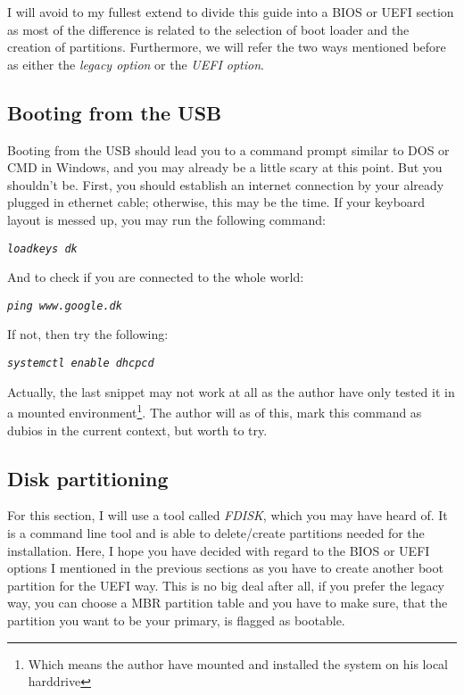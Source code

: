 \documentclass{article}
\newcommand{\code}[1]{\begin{center}
		\textit{\texttt{#1}}
\end{center}}
\begin{document}
	I will avoid to my fullest extend to divide this guide into a BIOS or UEFI section as most of the difference is related to the selection of boot loader and the creation of partitions. Furthermore, we will refer the two ways mentioned before as either  the  \textit{legacy option} or the  \textit{UEFI option}.\\
	
	 \subsection{Booting from the USB}
	 
	 Booting from the USB should lead you to a command prompt similar to DOS or CMD in Windows, and you may already be a little scary at this point. But you shouldn't be. First, you should establish an internet connection by your already plugged in ethernet cable; otherwise, this may be the time. If your keyboard layout is messed up, you may run the following command:
	 
	 \code{loadkeys dk}
	 
	 And to check if you are connected to the whole world:
	 
	 \code{ping www.google.dk}
	 
	 If not, then try the following:
	 
	 \code{systemctl enable dhcpcd}
	 
	 Actually, the last snippet may not work at all as the author have only tested it in a mounted environment\footnote{Which means the author have mounted and installed the system on his local harddrive}. The author will as of this, mark this command as dubios in the current context, but worth to try.\\
	 
	 \subsection{Disk partitioning}
	 
	 For this section, I will use a tool called \textit{FDISK}, which you may have heard of. It is a command line tool and is able to delete/create partitions needed for the installation. Here, I hope you have decided with regard to the BIOS or UEFI options I mentioned in the previous sections as you have to create another boot partition for the UEFI way. This is no big deal after all, if you prefer the legacy way, you can choose a MBR partition table and you have to make sure, that the partition you want to be your primary, is flagged as bootable.\\
	 
\end{document}
